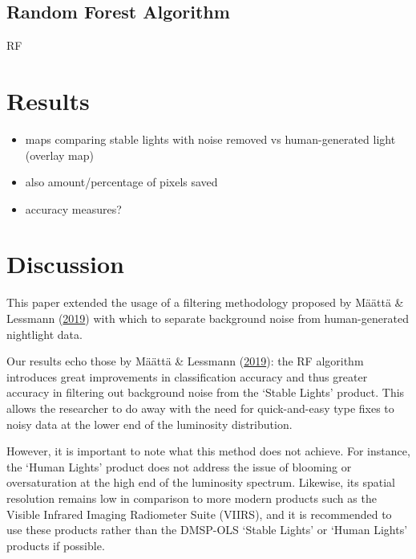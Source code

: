 \documentclass[11pt,preprint, authoryear]{elsarticle}
\numberwithin{equation}{section}
\numberwithin{figure}{section}
\numberwithin{table}{section}
\def\tightlist{} %
\begin{document}
\hypertarget{random-forest-algorithm}{%
\subsection{Random Forest Algorithm}\label{random-forest-algorithm}}

RF

\hypertarget{results}{%
\section{\texorpdfstring{Results
\label{Results}}{Results }}\label{results}}

\begin{itemize}
\tightlist
\item
  maps comparing stable lights with noise removed vs human-generated
  light (overlay map)
\item
  also amount/percentage of pixels saved
\item
  accuracy measures?
\end{itemize}

\hypertarget{discussion}{%
\section{\texorpdfstring{Discussion
\label{Discussion}}{Discussion }}\label{discussion}}

This paper extended the usage of a filtering methodology proposed by
Määttä \& Lessmann (\protect\hyperlink{ref-maatta}{2019}) with which to
separate background noise from human-generated nightlight data.

Our results echo those by Määttä \& Lessmann
(\protect\hyperlink{ref-maatta}{2019}): the RF algorithm introduces
great improvements in classification accuracy and thus greater accuracy
in filtering out background noise from the `Stable Lights' product. This
allows the researcher to do away with the need for quick-and-easy type
fixes to noisy data at the lower end of the luminosity distribution.

However, it is important to note what this method does not achieve. For
instance, the `Human Lights' product does not address the issue of
blooming or oversaturation at the high end of the luminosity spectrum.
Likewise, its spatial resolution remains low in comparison to more
modern products such as the Visible Infrared Imaging Radiometer Suite
(VIIRS), and it is recommended to use these products rather than the
DMSP-OLS `Stable Lights' or `Human Lights' products if possible.
\end{document}

